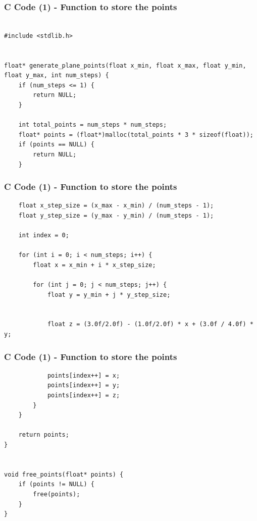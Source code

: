 \documentclass{beamer}
\begin{document}
\begin{frame}[fragile]
    \frametitle{C Code (1) - Function to store the points }

    \begin{lstlisting}

#include <stdlib.h>


float* generate_plane_points(float x_min, float x_max, float y_min, float y_max, int num_steps) {
    if (num_steps <= 1) { 
        return NULL;
    }

    int total_points = num_steps * num_steps;
    float* points = (float*)malloc(total_points * 3 * sizeof(float));
    if (points == NULL) {
        return NULL; 
    }
    \end{lstlisting}
\end{frame}
\begin{frame}[fragile]
    \frametitle{C Code (1) - Function to store the points }

    \begin{lstlisting}
    float x_step_size = (x_max - x_min) / (num_steps - 1);
    float y_step_size = (y_max - y_min) / (num_steps - 1);

    int index = 0;
   
    for (int i = 0; i < num_steps; i++) {
        float x = x_min + i * x_step_size;
        
        for (int j = 0; j < num_steps; j++) {
            float y = y_min + j * y_step_size;

          
            float z = (3.0f/2.0f) - (1.0f/2.0f) * x + (3.0f / 4.0f) * y;

    \end{lstlisting}
\end{frame}
\begin{frame}[fragile]
    \frametitle{C Code (1) - Function to store the points }

    \begin{lstlisting}
            points[index++] = x;
            points[index++] = y;
            points[index++] = z;
        }
    }

    return points;
}


void free_points(float* points) {
    if (points != NULL) {
        free(points);
    }
}




    \end{lstlisting}
\end{frame}
\end{document}
